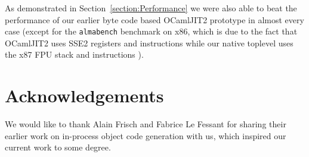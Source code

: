 \documentclass[10pt,a4paper,final,twocolumn]{article}
\begin{document}
As demonstrated in Section~\ref{section:Performance} we were also able to beat the performance of
our earlier byte code based OCamlJIT2 prototype in almost every case (except for the \texttt{almabench}
benchmark on x86, which is due to the fact that OCamlJIT2 uses SSE2 registers and instructions while
our native toplevel uses the x87 FPU stack and instructions \cite{Meurer10jit}).


\section*{Acknowledgements} \label{section:Acknowledgements}

We would like to thank Alain Frisch and Fabrice Le Fessant for sharing their earlier work on
in-process object code generation with us, which inspired our current work to some degree.




\end{document}
